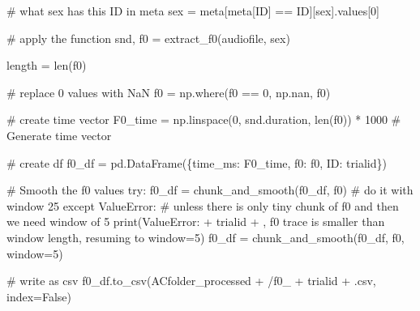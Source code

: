 \documentclass[
  letterpaper,
  DIV=11,
  numbers=noendperiod]{scrreprt}
\newenvironment{Shaded}{\begin{snugshade}}{\end{snugshade}}
\newcommand{\BuiltInTok}[1]{\textcolor[rgb]{0.00,0.23,0.31}{#1}}
\newcommand{\CommentTok}[1]{\textcolor[rgb]{0.37,0.37,0.37}{#1}}
\newcommand{\ControlFlowTok}[1]{\textcolor[rgb]{0.00,0.23,0.31}{#1}}
\newcommand{\DecValTok}[1]{\textcolor[rgb]{0.68,0.00,0.00}{#1}}
\newcommand{\NormalTok}[1]{\textcolor[rgb]{0.00,0.23,0.31}{#1}}
\newcommand{\OperatorTok}[1]{\textcolor[rgb]{0.37,0.37,0.37}{#1}}
\newcommand{\PreprocessorTok}[1]{\textcolor[rgb]{0.68,0.00,0.00}{#1}}
\newcommand{\StringTok}[1]{\textcolor[rgb]{0.13,0.47,0.30}{#1}}
\newcommand{\VariableTok}[1]{\textcolor[rgb]{0.07,0.07,0.07}{#1}}
\begin{document}
\begin{Shaded}
\begin{Highlighting}[]
    \CommentTok{\# what sex has this ID in meta}
\NormalTok{    sex }\OperatorTok{=}\NormalTok{ meta[meta[}\StringTok{\textquotesingle{}ID\textquotesingle{}}\NormalTok{] }\OperatorTok{==}\NormalTok{ ID][}\StringTok{\textquotesingle{}sex\textquotesingle{}}\NormalTok{].values[}\DecValTok{0}\NormalTok{]}

    \CommentTok{\# apply the function}
\NormalTok{    snd, f0 }\OperatorTok{=}\NormalTok{ extract\_f0(audiofile, sex)}

\NormalTok{    length }\OperatorTok{=} \BuiltInTok{len}\NormalTok{(f0)}

    \CommentTok{\# replace 0 values with NaN}
\NormalTok{    f0 }\OperatorTok{=}\NormalTok{ np.where(f0 }\OperatorTok{==} \DecValTok{0}\NormalTok{, np.nan, f0)}

    \CommentTok{\# create time vector}
\NormalTok{    F0\_time }\OperatorTok{=}\NormalTok{ np.linspace(}\DecValTok{0}\NormalTok{, snd.duration, }\BuiltInTok{len}\NormalTok{(f0)) }\OperatorTok{*} \DecValTok{1000}  \CommentTok{\# Generate time vector}

    \CommentTok{\# create df}
\NormalTok{    f0\_df }\OperatorTok{=}\NormalTok{ pd.DataFrame(\{}\StringTok{\textquotesingle{}time\_ms\textquotesingle{}}\NormalTok{: F0\_time, }\StringTok{\textquotesingle{}f0\textquotesingle{}}\NormalTok{: f0, }\StringTok{\textquotesingle{}ID\textquotesingle{}}\NormalTok{: trialid\})}

    \CommentTok{\# Smooth the f0 values}
    \ControlFlowTok{try}\NormalTok{:}
\NormalTok{        f0\_df }\OperatorTok{=}\NormalTok{ chunk\_and\_smooth(f0\_df, }\StringTok{\textquotesingle{}f0\textquotesingle{}}\NormalTok{) }\CommentTok{\# do it with window 25}
    \ControlFlowTok{except} \PreprocessorTok{ValueError}\NormalTok{:}
        \CommentTok{\# unless there is only tiny chunk of f0 and then we need window of 5}
        \BuiltInTok{print}\NormalTok{(}\StringTok{\textquotesingle{}ValueError: \textquotesingle{}} \OperatorTok{+}\NormalTok{ trialid }\OperatorTok{+} \StringTok{\textquotesingle{}, f0 trace is smaller than window length, resuming to window=5\textquotesingle{}}\NormalTok{)}
\NormalTok{        f0\_df }\OperatorTok{=}\NormalTok{ chunk\_and\_smooth(f0\_df, }\StringTok{\textquotesingle{}f0\textquotesingle{}}\NormalTok{, window}\OperatorTok{=}\DecValTok{5}\NormalTok{)}

    \CommentTok{\# write as csv}
\NormalTok{    f0\_df.to\_csv(ACfolder\_processed }\OperatorTok{+} \StringTok{\textquotesingle{}/f0\_\textquotesingle{}} \OperatorTok{+}\NormalTok{ trialid }\OperatorTok{+} \StringTok{\textquotesingle{}.csv\textquotesingle{}}\NormalTok{, index}\OperatorTok{=}\VariableTok{False}\NormalTok{)}
\end{Highlighting}
\end{Shaded}
\end{document}

